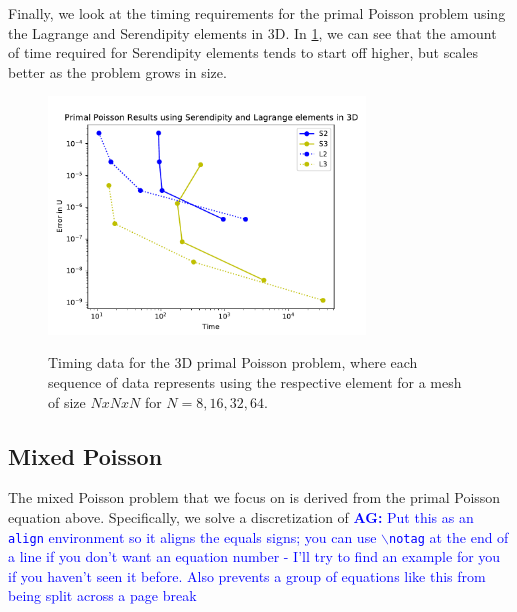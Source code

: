 \documentclass[manuscript,screen]{acmart}
\newcommand{\akg}[1]{\textcolor{blue}{\textbf{AG:} #1}}
\begin{document}


\noindent Finally, we look at the timing requirements for the primal Poisson problem using the Lagrange and Serendipity elements in 3D.  In \ref{fig:3dPrimalTime}, we can see that the amount of time required for Serendipity elements tends to start off higher, but scales better as the problem grows in size.  

  \begin{figure}[h!]
    \caption{Timing data for the 3D primal Poisson problem, where each sequence of data represents using the respective element for a mesh of size $N x N x N$ for $N = 8, 16, 32, 64$.}
    \includegraphics[width=0.75\textwidth]{3dPrimalTime.pdf}
    \label{fig:3dPrimalTime}
  \end{figure}



\subsection{Mixed Poisson}

  
The mixed Poisson problem that we focus on is derived from the primal Poisson equation above.  Specifically, we solve a discretization of \akg{Put this as an \texttt{align} environment so it aligns the equals signs; you can use \texttt{$\backslash$notag} at the end of a line if you don't want an equation number  - I'll try to find an example for you if you haven't seen it before.  Also prevents a group of equations like this from being split across a page break}
  
\end{document}
